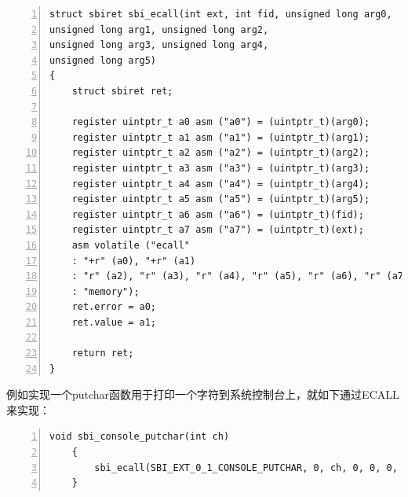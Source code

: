 \documentclass[UTF8,fontset=none,linespread=1.15]{ctexart}
\begin{document}
\begin{lstlisting}[numbers=left]
struct sbiret sbi_ecall(int ext, int fid, unsigned long arg0,
unsigned long arg1, unsigned long arg2,
unsigned long arg3, unsigned long arg4,
unsigned long arg5)
{
	struct sbiret ret;

	register uintptr_t a0 asm ("a0") = (uintptr_t)(arg0);
	register uintptr_t a1 asm ("a1") = (uintptr_t)(arg1);
	register uintptr_t a2 asm ("a2") = (uintptr_t)(arg2);
	register uintptr_t a3 asm ("a3") = (uintptr_t)(arg3);
	register uintptr_t a4 asm ("a4") = (uintptr_t)(arg4);
	register uintptr_t a5 asm ("a5") = (uintptr_t)(arg5);
	register uintptr_t a6 asm ("a6") = (uintptr_t)(fid);
	register uintptr_t a7 asm ("a7") = (uintptr_t)(ext);
	asm volatile ("ecall"
	: "+r" (a0), "+r" (a1)
	: "r" (a2), "r" (a3), "r" (a4), "r" (a5), "r" (a6), "r" (a7)
	: "memory");
	ret.error = a0;
	ret.value = a1;

	return ret;
}
\end{lstlisting}​
例如实现一个putchar函数用于打印一个字符到系统控制台上，就如下通过ECALL来实现：
\begin{lstlisting}[numbers=left]
	void sbi_console_putchar(int ch)
	{
		sbi_ecall(SBI_EXT_0_1_CONSOLE_PUTCHAR, 0, ch, 0, 0, 0, 0, 0);
	}
\end{lstlisting}
\end{document}
